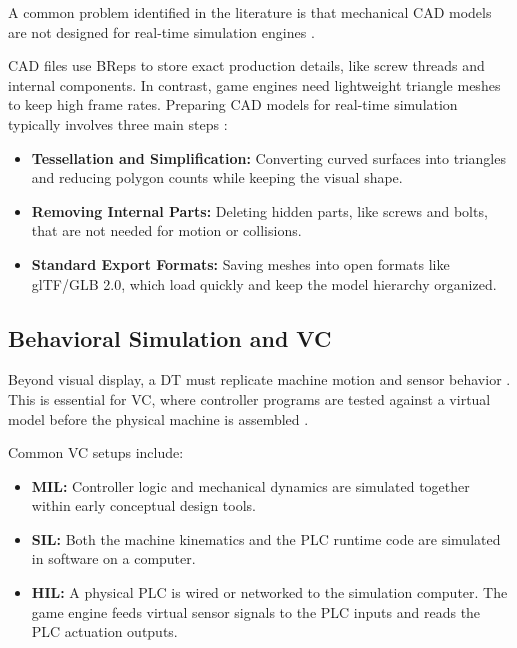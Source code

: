 A common problem identified in the literature is that mechanical \gls{CAD} models are not designed for real-time simulation engines \cite{Chowdhury2025,Striffler2023,Zheng2024}.

\gls{CAD} files use \glspl{BRep} to store exact production details, like screw threads and internal components. In contrast, game engines need lightweight triangle meshes to keep high frame rates. Preparing \gls{CAD} models for real-time simulation typically involves three main steps \cite{Chowdhury2025,Striffler2023}:
\begin{itemize}
    \item \textbf{Tessellation and Simplification:} Converting curved surfaces into triangles and reducing polygon counts while keeping the visual shape.
    \item \textbf{Removing Internal Parts:} Deleting hidden parts, like screws and bolts, that are not needed for motion or collisions.
    \item \textbf{Standard Export Formats:} Saving meshes into open formats like \gls{glTF}/\gls{GLB} 2.0, which load quickly and keep the model hierarchy organized.
\end{itemize}

\subsection{Behavioral Simulation and \texorpdfstring{\gls{VC}}{Virtual Commissioning}}

Beyond visual display, a \gls{DT} must replicate machine motion and sensor behavior \cite{Striffler2023}. This is essential for \gls{VC}, where controller programs are tested against a virtual model before the physical machine is assembled \cite{Lee2014}.

Common \gls{VC} setups include:
\begin{itemize}
    \item \textbf{\gls{MIL}:} Controller logic and mechanical dynamics are simulated together within early conceptual design tools.
    \item \textbf{\gls{SIL}:} Both the machine kinematics and the \gls{PLC} runtime code are simulated in software on a computer.
    \item \textbf{\gls{HIL}:} A physical \gls{PLC} is wired or networked to the simulation computer. The game engine feeds virtual sensor signals to the \gls{PLC} inputs and reads the \gls{PLC} actuation outputs.
\end{itemize}

